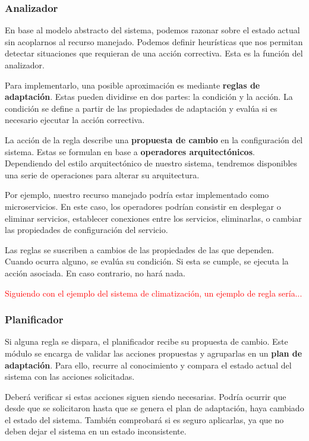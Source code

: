 \subsubsection{Analizador}

En base al modelo abstracto del sistema, podemos razonar sobre el estado actual sin acoplarnos al recurso manejado. Podemos definir heurísticas que nos permitan detectar situaciones que requieran de una acción correctiva. Esta es la función del analizador.

Para implementarlo, una posible aproximación es mediante \textbf{reglas de adaptación}. Estas pueden dividirse en dos partes: la condición y la acción. La condición se define a partir de las propiedades de adaptación y evalúa si es necesario ejecutar la acción correctiva.

La acción de la regla describe una \textbf{propuesta de cambio} en la configuración del sistema. Estas se formulan en base a \textbf{operadores arquitectónicos}. \cite{garlanIncreasingSystemDependability2003} Dependiendo del estilo arquitectónico de nuestro sistema, tendremos disponibles una serie de operaciones para alterar su arquitectura.

Por ejemplo, nuestro recurso manejado podría estar implementado como microservicios. En este caso, los operadores podrían consistir en desplegar o eliminar servicios, establecer conexiones entre los servicios, eliminarlas, o cambiar las propiedades de configuración del servicio. \cite{fonsServiciosAdaptivereadyPara2021}

Las reglas se suscriben a cambios de las propiedades de las que dependen. Cuando ocurra alguno, se evalúa su condición. Si esta se cumple, se ejecuta la acción asociada. En caso contrario, no hará nada.

\textcolor{red}{Siguiendo con el ejemplo del sistema de climatización, un ejemplo de regla sería...}

\subsubsection{Planificador}

Si alguna regla se dispara, el planificador recibe su propuesta de cambio. Este módulo se encarga de validar las acciones propuestas y agruparlas en un \textbf{plan de adaptación}. Para ello, recurre al conocimiento y compara el estado actual del sistema con las acciones solicitadas.

Deberá verificar si estas acciones siguen siendo necesarias. Podría ocurrir que desde que se solicitaron hasta que se genera el plan de adaptación, haya cambiado el estado del sistema. También comprobará si es seguro aplicarlas, ya que no deben dejar el sistema en un estado inconsistente.

